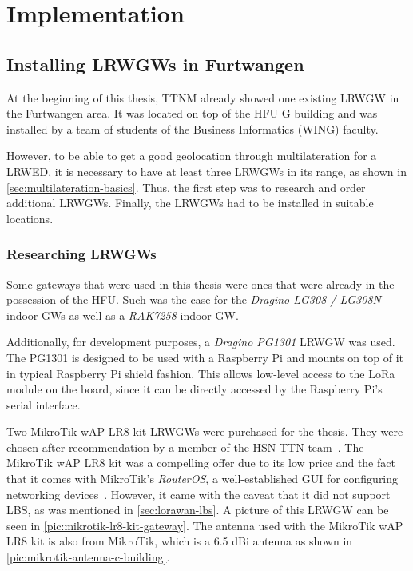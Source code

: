 \chapter{Implementation}

\section{Installing \aclp{LRWGW} in Furtwangen}

At the beginning of this thesis, \ac{TTNM} already showed one existing \acl{LRWGW} in the Furtwangen area.
It was located on top of the \ac{HFU} G building and was installed by a team of students of the Business Informatics (WING) faculty.

However, to be able to get a good geolocation through multilateration for a \acl{LRWED}, it is necessary to have at least three \aclp{LRWGW} in its range, as shown in \cref{sec:multilateration-basics}.
Thus, the first step was to research and order additional \aclp{LRWGW}.
Finally, the \aclp{LRWGW} had to be installed in suitable locations.

\subsection{Researching \aclp{LRWGW}}

Some gateways that were used in this thesis were ones that were already in the possession of the \ac{HFU}.
Such was the case for the \emph{Dragino LG308 / LG308N} indoor \aclp{GW} as well as a \emph{RAK7258} indoor \acl{GW}.

Additionally, for development purposes, a \emph{Dragino PG1301} \acl{LRWGW} was used.
The PG1301 is designed to be used with a Raspberry Pi and mounts on top of it in typical Raspberry Pi shield fashion.
This allows low-level access to the \ac{LoRa} module on the board, since it can be directly accessed by the Raspberry Pi's serial interface.

Two MikroTik wAP LR8 kit \aclp{LRWGW} were purchased for the thesis.
They were chosen after recommendation by a member of the \ac{HSN-TTN} team~\cite{hochschwarzwald_smart_net_-_thethingsnetwork_eingesetzte_nodate}.
The MikroTik wAP LR8 kit was a compelling offer due to its low price and the fact that it comes with MikroTik's \emph{RouterOS}, a well-established \ac{GUI} for configuring networking devices~\cite{mikrotik_mikrotik_nodate}.
However, it came with the caveat that it did not support \ac{LBS}, as was mentioned in \cref{sec:lorawan-lbs}.
A picture of this \acl{LRWGW} can be seen in \cref{pic:mikrotik-lr8-kit-gateway}.
The antenna used with the MikroTik wAP LR8 kit is also from MikroTik, which is a 6.5 dBi antenna as shown in \cref{pic:mikrotik-antenna-c-building}.

